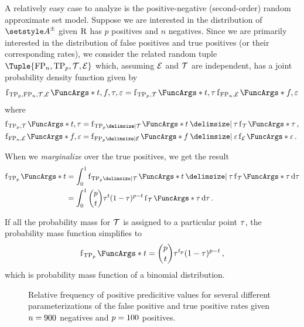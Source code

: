 \documentclass[10pt,final,hidelinks]{article}
\numberwithin{equation}{section}
\begin{document}
A relatively easy case to analyze is the positive-negative (second-order) random approximate set model.
Suppose we are interested in the distribution of $\ASet{A}$ given $\mathrm{R}$ has $p$ positives and $n$ negatives.
Since we are primarily interested in the distribution of false positives and true positives (or their corresponding rates), we consider the related random tuple $\Tuple{\FP_n, \TP_p, \TPR, \FPR}$ which, assuming $\mathcal{E}$ and $\mathcal{T}$ are independent, has a joint probability density function given by
\begin{equation}
	\PDF{t,f,\tprate,\fprate}[\TP_p, \FP_n,\TPR,\FPR] = \PDF{t, \tprate}[\TP_p,\TPR] \PDF{f,\fprate}[\FP_n,\FPR]
\end{equation}
where
\begin{align}
	\PDF{t,\tprate}[\TP_p,\TPR] &= \PDF{t \Given \tprate}[\TP_p \Given \TPR] \PDF{\tprate}[\TPR]\,,\\
	\PDF{f,\fprate}[\FP_n,\FPR] &= \PDF{f \Given \fprate}[\FP_p \Given \FPR] \PDF{\fprate}[\FPR]\,.
\end{align}

When we \emph{marginalize} over the true positives, we get the result
\begin{equation}
\begin{split}
	\PDF{t}[\TP_p] &= \int_{0}^{1} \PDF{t \Given \tprate}[\TP_p \Given \TPR] \PDF{\tprate}[\TPR] \dif \tprate\\
	                 &= \int_{0}^{1} \binom{p}{t} \tprate^{t}(1-\tprate)^{p-t} \PDF{\tprate}[\TPR] \dif \tprate\,.
\end{split}
\end{equation}

If all the probability mass for $\mathcal{T}$ is assigned to a particular point $\tau$, the probability mass function simplifies to
\begin{equation}
\PDF{t}[\TP_p] = \binom{p}{t} \tprate^{t_p}(1-\tprate)^{p-t}\,,
\end{equation}
which is probability mass function of a binomial distribution.

\begin{figure}
	\def\svgwidth{\columnwidth}
	\centering
	\captionsetup{justification=centering}
	\caption
	{
		Relative frequency of positive predicitive values for several different parameterizations of the false positive and true positive rates given $n = 900$ negatives and $p=100$ positives.
	}    
	
	\label{fig:mixnorm}
\end{figure}
\end{document}
